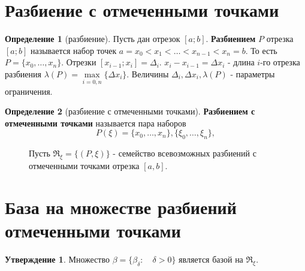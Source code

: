 \documentclass{report}
\theoremstyle{definition}
\newtheorem*{definition}{Определение}
\newtheorem*{statement}{Утверждение}
\begin{document}
\section{Разбиение с отмеченными точками}

\begin{definition}[разбиение]
    Пусть дан отрезок $[a;b]$. \textbf{Разбиением} $P$ отрезка $[a;b]$ называется набор точек $a=x_{0}<x_{1}<\ldots
        <x_{n-1}<x_{n}=b$. То есть $P = \{x_{0},\ldots,x_{n}\}$. Отрезки $[x_{i-1};x_{i}] = \Delta_{i}$.
    $x_{i}-x_{i-1} = \Delta x_{i}$ - длина $i$-го отрезка разбиения $\lambda(P) = \underset{i=\overline{0,n}}
        {\max}\{\Delta x_{i}\}$. Величины $\Delta_{i}, \Delta x_{i}, \lambda(P)$ - параметры ограничения.
\end{definition}

\begin{definition}[разбиение с отмеченными точками]
    \textbf{Разбиением с отмеченными точками} называется пара наборов
    \begin{equation*}
        P(\xi) = \{x_{0},\ldots,x_{n}\},\{\xi_{0},\ldots,\xi_{n}\},
    \end{equation*}
    \begin{figure}[h]
        \begin{minipage}[h]{0.49\linewidth}
        \end{minipage}
        \hfill
        \begin{minipage}[h]{0.49\linewidth}
            Пусть $\Re_{\xi} = \{(P,\xi)\}$ - семейство всевозможных разбиений с отмеченными точками отрезка $[a,b]$.
        \end{minipage}
    \end{figure}
\end{definition}

\section{База на множестве разбиений отмеченными точками}

\begin{statement}
    Множество $\beta = \{\beta_{\delta}:\quad \delta > 0\}$ является базой на $\Re_{\xi}$.
\end{statement}
\end{document}
